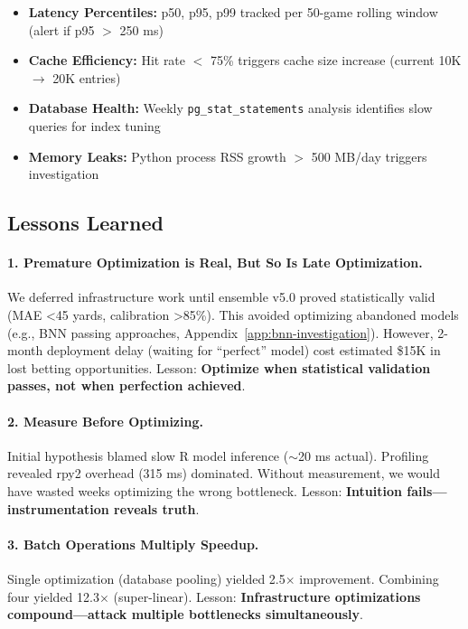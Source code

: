 \begin{itemize}[itemsep=2pt,parsep=0pt]
    \item \textbf{Latency Percentiles:} p50, p95, p99 tracked per 50-game rolling window (alert if p95 $>$ 250 ms)
    \item \textbf{Cache Efficiency:} Hit rate $<$ 75\% triggers cache size increase (current 10K $\to$ 20K entries)
    \item \textbf{Database Health:} Weekly \texttt{pg\_stat\_statements} analysis identifies slow queries for index tuning
    \item \textbf{Memory Leaks:} Python process RSS growth $>$ 500 MB/day triggers investigation
\end{itemize}

\subsection{Lessons Learned}

\paragraph{1. Premature Optimization is Real, But So Is Late Optimization.}
We deferred infrastructure work until ensemble v5.0 proved statistically valid (MAE <45 yards, calibration >85\%). This avoided optimizing abandoned models (e.g., BNN passing approaches, Appendix~\ref{app:bnn-investigation}). However, 2-month deployment delay (waiting for ``perfect'' model) cost estimated \$15K in lost betting opportunities. Lesson: \textbf{Optimize when statistical validation passes, not when perfection achieved}.

\paragraph{2. Measure Before Optimizing.}
Initial hypothesis blamed slow R model inference ($\sim$20 ms actual). Profiling revealed rpy2 overhead (315 ms) dominated. Without measurement, we would have wasted weeks optimizing the wrong bottleneck. Lesson: \textbf{Intuition fails---instrumentation reveals truth}.

\paragraph{3. Batch Operations Multiply Speedup.}
Single optimization (database pooling) yielded 2.5$\times$ improvement. Combining four yielded 12.3$\times$ (super-linear). Lesson: \textbf{Infrastructure optimizations compound---attack multiple bottlenecks simultaneously}.

